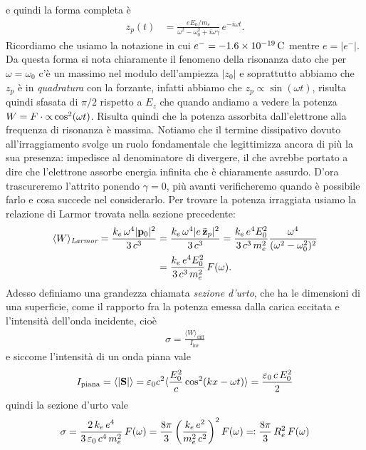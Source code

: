 e quindi la forma completa è
\begin{align}
  z_{p}(t) &= \frac{{eE_0}/{m_e}}{\omega^2 -\omega_0^2 + i\omega \gamma} \,e^{-i\omega t}.
\end{align}
Ricordiamo che usiamo la notazione in cui $ e^- = \SI{-1.6e-19}{\C} $ mentre $ e = |e^-| $. 
Da questa forma si nota chiaramente il fenomeno della risonanza dato che per $ \omega = \omega_0 $ c'è un massimo nel modulo dell'ampiezza $ |z_0| $ e 
soprattutto abbiamo che $ z_p $ è in \textit{quadratura} con la forzante, infatti abbiamo che $ z_p \propto \sin(\omega t) $, risulta quindi sfasata di 
$ \pi/2 $ rispetto a $ E_z $ che quando andiamo a vedere la potenza $ W = F \cdot \mathbf{\propto} \cos^2 (\omega t) $. Risulta quindi che la potenza assorbita 
dall'elettrone alla frequenza di risonanza è massima. Notiamo che il termine dissipativo dovuto all'irraggiamento svolge un ruolo fondamentale che 
legittimizza ancora di più la sua presenza: impedisce al denominatore di divergere, il che avrebbe portato a dire che l'elettrone assorbe energia infinita 
che è chiaramente assurdo. D'ora trascureremo l'attrito ponendo $ \gamma = 0 $, più avanti verificheremo quando è possibile farlo e cosa succede nel 
considerarlo. Per trovare la potenza irraggiata usiamo la relazione di Larmor trovata nella sezione precedente:
\begin{align}
  \langle W \rangle_{\textit{Larmor}} = \frac{k_e \,\omega ^4 |\mathbf{p}_0|^2}{3\, c^3} &= \frac{k_e \,\omega ^4 |e\,\ddot{\mathbf{z}}_p|^2}{3\, c^3} 
  = \frac{k_e \, e^4 E_0^2}{3\,c^3\,m_e^2} \frac{\omega^4}{(\omega^2 -\omega_0^2)^2}
  \\
  &= \frac{k_e \, e^4 E_0^2}{3\,c^3\,m_e^2} \, F(\omega).
\end{align}
Adesso definiamo una grandezza chiamata \textit{sezione d'urto}, che ha le dimensioni di una superficie, come il rapporto fra la potenza emessa dalla 
carica eccitata e l'intensità dell'onda incidente, cioè 
\begin{align}
  \sigma = \frac{\langle W \rangle_{\text{diff}}}{I_{\text{inc}}}
\end{align}
e siccome l'intensità di un onda piana vale 
\begin{align}
  I_{\text{piana}} = \langle |\mathbf{S}| \rangle = \varepsilon_0 c^2\langle \frac{ E_0^2}{c} \cos^2(kx - \omega t) \rangle = \frac{\varepsilon_0 \, c \,E_0^2}{2}
\end{align}
quindi la sezione d'urto vale
\begin{align}
  \sigma = \frac{2 \, k_e \, e^4}{3\,\varepsilon_0\,c^4 \,m_e^2}\, F(\omega) = \frac{8\pi}{3} \left( \frac{k_e\,e^2}{m_e^2\,c^2} \right)^2 F(\omega) 
  \eqcolon \frac{8\pi}{3}\, R_e^2 \,F(\omega)
\end{align}
